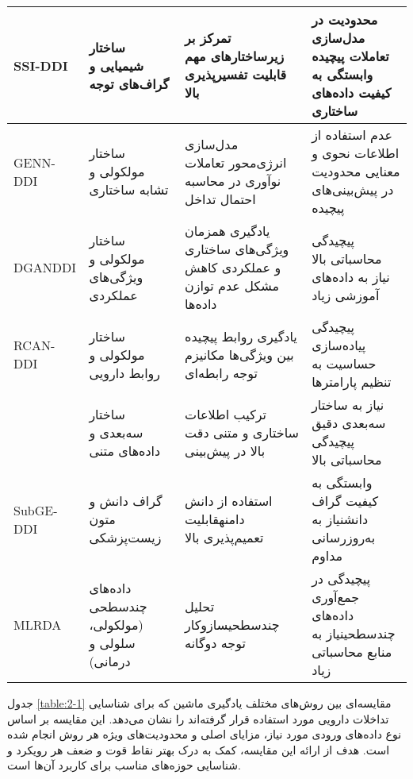 \begin{table}[!t]
{\begin{tabular}{|P{2.7cm}|P{3.8cm}|P{4.2cm}|P{4.8cm}|}
			\hline
			SSI-DDI \cite{ref_nyamabo2021} & ساختار شیمیایی و گراف‌های توجه & تمرکز بر زیرساختارهای مهم \newline قابلیت تفسیرپذیری بالا & محدودیت در مدل‌سازی تعاملات پیچیده \newline وابستگی به کیفیت داده‌های ساختاری \\
			\hline
			GENN-DDI \cite{ref_xu2019} & ساختار مولکولی و تشابه ساختاری & مدل‌سازی انرژی‌محور تعاملات \newline نوآوری در محاسبه احتمال تداخل & عدم استفاده از اطلاعات نحوی و معنایی \newline محدودیت در پیش‌بینی‌های پیچیده \\
			\hline
			DGANDDI \cite{ref_yu2023} & ساختار مولکولی و ویژگی‌های عملکردی & یادگیری همزمان ویژگی‌های ساختاری و عملکردی \newline کاهش مشکل عدم توازن داده‌ها & پیچیدگی محاسباتی بالا \newline نیاز به داده‌های آموزشی زیاد \\
			\hline
			RCAN-DDI \cite{ref_zhang2024} & ساختار مولکولی و روابط دارویی & یادگیری روابط پیچیده بین ویژگی‌ها \newline مکانیزم توجه رابطه‌ای & پیچیدگی پیاده‌سازی \newline حساسیت به تنظیم پارامترها \\
			\hline
			 \cite{ref_he2023} & ساختار سه‌بعدی و داده‌های متنی & ترکیب اطلاعات ساختاری و متنی \newline دقت بالا در پیش‌بینی & نیاز به ساختار سه‌بعدی دقیق \newline پیچیدگی محاسباتی بالا \\
			\hline
			SubGE-DDI \cite{ref_shi2024} & گراف دانش و متون زیست‌پزشکی & استفاده از دانش دامنه\newline قابلیت تعمیم‌پذیری بالا & وابستگی به کیفیت گراف دانش\newline نیاز به به‌روزرسانی مداوم \\
			\hline
			MLRDA \cite{ref_dai2020} & داده‌های چندسطحی (مولکولی، سلولی و درمانی) & تحلیل چندسطحی\newline سازوکار توجه دوگانه & پیچیدگی در جمع‌آوری داده‌های چندسطحی\newline نیاز به منابع محاسباتی زیاد \\
			\hline
		\end{tabular}
	}
	
\end{table}

جدول \ref{table:2-1} مقایسه‌ای بین روش‌های مختلف یادگیری ماشین که برای شناسایی تداخلات دارویی مورد استفاده قرار گرفته‌اند را نشان می‌دهد. این مقایسه بر اساس نوع داده‌های ورودی مورد نیاز، مزایای اصلی و محدودیت‌های ویژه هر روش انجام شده است. هدف از ارائه این مقایسه، کمک به درک بهتر نقاط قوت و ضعف هر رویکرد و شناسایی حوزه‌های مناسب برای کاربرد آن‌ها است.


